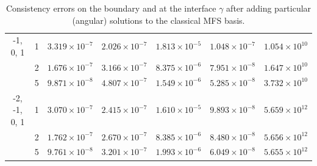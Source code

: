 \begin{table}[!htbp]
\begin{longtable}{ccccccc}
        -1, 0, 1 & 1 & $3.319\times10^{-7}$ & $2.026\times10^{-7}$ & $1.813\times10^{-5}$ & $1.048\times10^{-7}$ & $1.054\times10^{10}$ \\
        & 2 & $1.676\times10^{-7}$ & $3.166\times10^{-7}$ & $8.375\times10^{-6}$ & $7.951\times10^{-8}$ & $1.647\times10^{10}$ \\
        & 5 & $9.871\times10^{-8}$ & $4.807\times10^{-7}$ & $1.549\times10^{-6}$ & $5.285\times10^{-8}$ & $3.732\times10^{10}$ \\
        \midrule[\heavyrulewidth] %

        -2, -1, 0, 1 & 1 & $3.070\times10^{-7}$ & $2.415\times10^{-7}$ & $1.610\times10^{-5}$ & $9.893\times10^{-8}$ & $5.659\times10^{12}$ \\
        & 2 & $1.762\times10^{-7}$ & $2.670\times10^{-7}$ & $8.385\times10^{-6}$ & $8.480\times10^{-8}$ & $5.656\times10^{12}$ \\
        & 5 & $9.761\times10^{-8}$ & $3.201\times10^{-7}$ & $1.993\times10^{-6}$ & $6.049\times10^{-8}$ & $5.655\times10^{12}$ \\
        \midrule[\heavyrulewidth] %
    \end{longtable}
    \caption{Consistency errors on the boundary and at the interface \(\gamma\) after adding particular (angular) solutions to the classical \ac{MFS} basis.}
    \label{tab:transmission_results_L_shape_axis_particular}
\end{table}

